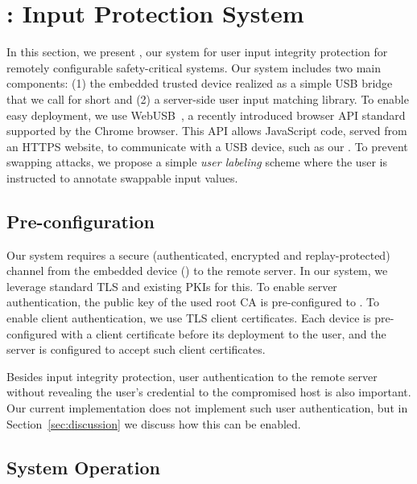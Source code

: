 
\section{\name: Input Protection System}
\label{sec:integriKey}

In this section, we present \name, our system for user input integrity protection for remotely configurable safety-critical systems. Our system includes two main components: (1) the embedded trusted device realized as a simple USB bridge that we call for short \device and (2) a server-side user input matching library. To enable easy deployment, we use WebUSB~\cite{webusb}, a recently introduced browser API standard supported by the Chrome browser. This API allows JavaScript code, served from an HTTPS website, to communicate with a USB device, such as our \device. To prevent swapping attacks, we propose a simple \emph{user labeling} scheme where the user is instructed to annotate swappable input values. 

\subsection{Pre-configuration}
\label{sec:integriKey:initialization} 

Our system requires a secure (authenticated, encrypted and replay-protected) channel from the embedded device (\device) to the remote server. In our system, we leverage standard TLS and existing PKIs for this. To enable server authentication, the public key of the used root CA is pre-configured to \device. To enable client authentication, we use TLS client certificates. Each \device device is pre-configured with a client certificate before its deployment to the user, and the server is configured to accept such client certificates. 

Besides input integrity protection, user authentication to the remote server without revealing the user's credential to the compromised host is also important. Our current implementation does not implement such user authentication, but in Section~\ref{sec:discussion} we discuss how this can be enabled.



\subsection{System Operation}


